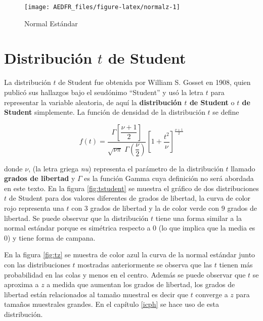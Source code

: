 \documentclass[letterpaper,]{book}
\begin{document}
\begin{figure}[h!]

{\centering \texttt{[image: AEDFR\_files/figure-latex/normalz-1]} 

}

\caption{Normal Estándar}\label{fig:normalz}
\end{figure}

\hypertarget{distribucion-t-de-student}{%
\section{\texorpdfstring{Distribución \(t\) de Student}{Distribución t de Student}}\label{distribucion-t-de-student}}

La distribución \(t\) de Student fue obtenida por William S. Gosset en 1908, quien publicó sus hallazgos bajo el seudónimo ``Student'' y usó la letra \(t\) para representar la variable aleatoria, de aquí la \textbf{distribución \(t\) de Student} o \textbf{\(t\) de Student} simplemente. La función de densidad de la distribución \(t\) se define

\begin{equation}
f\left(t\right)=\dfrac{\Gamma\left[\dfrac{\nu+1}{2}\right]}{\sqrt{\nu \pi} \; \Gamma\left(\dfrac{\nu}{2}\right)}\left[1 + \dfrac{t^2}{\nu} \right]^{\frac{\nu+1}{2}}
\label{eq:studentpdf}
\end{equation}

donde \(\nu\), (la letra griega \emph{nu}) representa el parámetro de la distribución \(t\) llamado \textbf{grados de libertad} y \(\Gamma\) es la función Gamma cuya definición no será abordada en este texto.
En la figura \ref{fig:tstudent} se muestra el gráfico de dos distribuciones \(t\) de Student para dos valores diferentes de grados de libertad, la curva de color rojo representa una \(t\) con 3 grados de libertad y la de color verde con \(9\) grados de libertad. Se puede observar que la distribución \(t\) tiene una forma similar a la normal estándar porque es simétrica respecto a \(0\) (lo que implica que la media es \(0\)) y tiene forma de campana.

En la figura \ref{fig:tz} se muestra de color azul la curva de la normal estándar junto con las distribuciones \(t\) mostradas anteriormente se observa que las \(t\) tienen más probabilidad en las colas y menos en el centro. Además se puede observar que \(t\) se aproxima a \(z\) a medida que aumentan los grados de libertad, los grados de libertad están relacionados al tamaño muestral es decir que \(t\) converge a \(z\) para tamaños muestrales grandes. En el capítulo \ref{icph} se hace uso de esta distribución.
\end{document}
